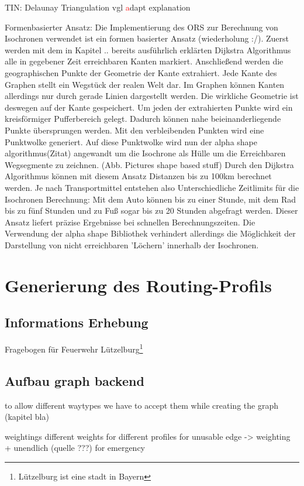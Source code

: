 \documentclass[10pt,a4paper]{article}
\newcommand\todo[1]{\textcolor{red}{#1}}
\begin{document}
TIN: Delaunay Triangulation
vgl \cite{isos}
\todo adapt explanation


Formenbasierter Ansatz:
Die Implementierung des ORS zur Berechnung von Isochronen verwendet ist ein formen basierter Ansatz (wiederholung :/). Zuerst werden mit dem in Kapitel .. bereits ausführlich erklärten Dijkstra Algorithmus alle in gegebener Zeit erreichbaren Kanten markiert. Anschließend werden die geographischen Punkte der Geometrie der Kante extrahiert. Jede Kante des Graphen stellt ein Wegstück der realen Welt dar. Im Graphen können Kanten allerdings nur durch gerade Linien dargestellt werden. Die wirkliche Geometrie ist deswegen auf der Kante gespeichert. Um jeden der extrahierten Punkte wird ein kreisförmiger Pufferbereich gelegt. Dadurch können nahe beieinanderliegende Punkte übersprungen werden. Mit den verbleibenden Punkten wird eine Punktwolke generiert. Auf diese Punktwolke wird nun der alpha shape algorithmus(Zitat) angewandt um die Isochrone als Hülle um die Erreichbaren Wegsegmente zu zeichnen.
(Abb. Pictures shape based stuff)
Durch den Dijkstra Algorithmus können mit diesem Ansatz Distanzen bis zu 100km berechnet werden. Je nach Transportmittel entstehen also Unterschiedliche Zeitlimits für die Isochronen Berechnung: Mit dem Auto können bis zu einer Stunde, mit dem Rad bis zu fünf Stunden und zu Fuß sogar bis zu 20 Stunden abgefragt werden. Dieser Ansatz liefert präzise Ergebnisse bei schnellen Berechnungszeiten. Die Verwendung der alpha shape Bibliothek verhindert allerdings die Möglichkeit der Darstellung von nicht erreichbaren 'Löchern' innerhalb der Isochronen.


\section{Generierung des Routing-Profils}

\subsection{Informations Erhebung}
Fragebogen für Feuerwehr Lützelburg\footnote{Lützelburg ist eine stadt in Bayern}

\subsection{Aufbau graph backend}
to allow different waytypes we have to accept them while creating the graph (kapitel bla)

weightings 
 different weights for different profiles
 for unusable edge -> weighting + unendlich (quelle ???)
 for emergency 
 
\end{document}
